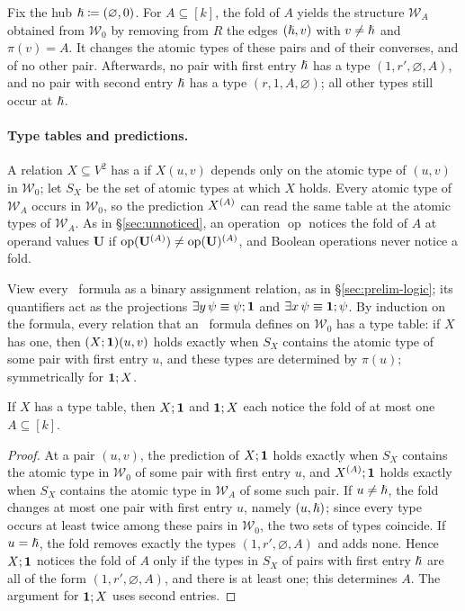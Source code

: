 Fix the hub $\hslash\coloneqq(\varnothing,0)$. For $A\subseteq[k]$, the fold
of $A$ yields the structure $\mathcal W_A$ obtained from $\mathcal W_0$ by
removing from $R$ the edges $(\hslash,v)$ with $v\ne\hslash$ and $\pi(v)=A$. It
changes the atomic types of these pairs and of their converses, and of no
other pair. Afterwards, no pair with first entry $\hslash$ has a type
$(1,r',\varnothing,A)$, and no pair with second entry $\hslash$ has a type
$(r,1,A,\varnothing)$; all other types still occur at $\hslash$.

\paragraph{Type tables and predictions.}
A relation $X\subseteq V^2$ has a  if $X(u,v)$ depends
only on the atomic type of $(u,v)$ in $\mathcal W_0$; let $S_X$ be the
set of atomic types at which $X$ holds. Every atomic type of
$\mathcal W_A$ occurs in $\mathcal W_0$, so the prediction $X^{(A)}$ can
read the same table at the atomic types of $\mathcal W_A$. As in
\S\ref{sec:unnoticed}, an operation $\operatorname{op}$ notices the fold
of $A$ at operand values $\mathbf U$ if
$\operatorname{op}(\mathbf U^{(A)})\ne\operatorname{op}(\mathbf U)^{(A)}$,
and Boolean operations never notice a fold.

View every \FOtwo\ formula as a binary assignment relation, as in
\S\ref{sec:prelim-logic}; its quantifiers act as the projections
$\exists y\,\psi\equiv\psi;\mathbf{1}$ and $\exists x\,\psi\equiv\mathbf{1};\psi$.
By induction on the formula, every relation that an \FOtwo\ formula
defines on $\mathcal W_0$ has a type table: if $X$ has one, then
$(X;\mathbf{1})(u,v)$ holds exactly when $S_X$ contains the atomic type of some
pair with first entry $u$, and these types are determined by $\pi(u)$;
symmetrically for $\mathbf{1};X$.

\begin{lemma}\label{lem:W-projection}
If $X$ has a type table, then $X;\mathbf{1}$ and $\mathbf{1};X$ each notice the fold
of at most one $A\subseteq[k]$.
\end{lemma}
\begin{proof}
At a pair $(u,v)$, the prediction of $X;\mathbf{1}$ holds exactly when $S_X$
contains the atomic type in $\mathcal W_0$ of some pair with first entry
$u$, and $X^{(A)};\mathbf{1}$ holds exactly when $S_X$ contains the atomic type
in $\mathcal W_A$ of some such pair. If $u\ne\hslash$, the fold changes at
most one pair with first entry $u$, namely $(u,\hslash)$; since every type
occurs at least twice among these pairs in $\mathcal W_0$, the two sets
of types coincide. If $u=\hslash$, the fold removes exactly the types
$(1,r',\varnothing,A)$ and adds none. Hence $X;\mathbf{1}$ notices the fold of
$A$ only if the types in $S_X$ of pairs with first entry $\hslash$ are all of
the form $(1,r',\varnothing,A)$, and there is at least one; this
determines $A$. The argument for $\mathbf{1};X$ uses second entries.
\end{proof}

